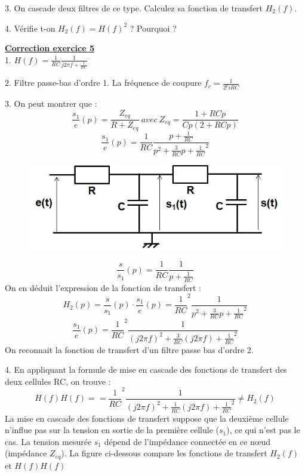 \documentclass[11pt]{report}
\begin{document}
	3. On cascade deux filtres de ce type. Calculez sa fonction de transfert $H_{2}(f)$.
	
	4. Vérifie t-on $H_{2}(f)=H(f)^{2}$ ? Pourquoi ?
	
	\vspace{1\baselineskip}
	
	\textbf{\underline{Correction exercice 5}}\\
	1. $H(f)=\frac{1}{RC}\frac{1}{j2\pi f+\frac{1}{RC}}$
	
	2. Filtre passe-bas d'ordre 1. La fréquence de coupure $f_{c}=\frac{1}{2^pi RC}$
	
	3. On peut montrer que :
	\begin{equation*}
	\frac{s_{1}}{e}(p)=\frac{Z_{eq}}{R+Z_{eq}}~avec~Z_{eq}=\frac{1+RCp}{Cp(2+RCp)}
	\end{equation*}
	\begin{equation*}
	\frac{s_{1}}{e}(p)=\frac{1}{RC}\frac{p+\frac{1}{RC}}{p^{2}+\frac{3}{RC}p+\frac{1}{RC}^{2}}
	\end{equation*}
	
	\begin{figure}[h!]
		\centering
		\includegraphics[scale=0.5]{images/Cascade_filtre_RC_passe_bas.jpg} 
	\end{figure}

	\begin{equation*}
	\frac{s}{s_{1}}(p)=\frac{1}{RC}\frac{1}{p+\frac{1}{RC}}
	\end{equation*}
	On en déduit l'expression de la fonction de transfert :
	\begin{equation*}
	H_{2}(p)=\frac{s}{s_{1}}(p)\cdot \frac{s_{1}}{e}(p)=\frac{1}{RC}^{2}\frac{1}{p^{2}+\frac{3}{RC}p+\frac{1}{RC}^{2}}
	\end{equation*} 
	\begin{equation*}
	\frac{s_{1}}{e}(p)=\frac{1}{RC}^{2}\frac{1}{(j2\pi f)^{2}+\frac{3}{RC}(j2\pi f)+\frac{1}{RC}^{2}}
	\end{equation*}
	On reconnait la fonction de transfert d'un filtre passe bas d'ordre 2.
	
	4. En appliquant la formule de mise en cascade des fonctions de transfert des deux cellules RC, on trouve :
	\begin{equation*}
	H(f)H(f)==\frac{1}{RC}^{2}\frac{1}{(j2\pi f)^{2}+\frac{1}{RC}(j2\pi f)+\frac{1}{RC}^{2}} \neq H_{2}(f)
	\end{equation*}
	La mise en cascade des fonctions de transfert suppose que la deuxième cellule n'influe pas sur la tension en sortie de la première cellule ($s_{1}$), ce qui n'est pas le cas. La tension mesurée $s_{1}$ dépend de l'impédance connectée en ce nœud (impédance $Z_{eq}$). La figure ci-dessous compare les fonctions de transfert $H_{2}(f)$ et $H(f)H(f)$
	
\end{document}
